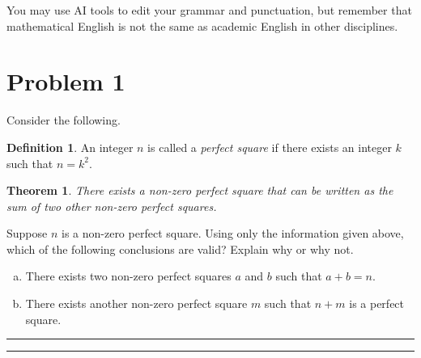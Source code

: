 \documentclass{article}
\newtheorem*{theorem}{Theorem} %
\theoremstyle{definition}
\newtheorem*{definition}{Definition} %
\newenvironment{solution}{\bigskip\hrule{\hfill}}{\bigskip\hrule{\hfill}} %
\begin{document}
You may use AI tools to edit your grammar and punctuation, but remember that mathematical English is not the same as academic English in other disciplines. 

\vfill

\newpage


\section*{Problem 1}

Consider the following.

\begin{definition}
    An integer $n$ is called a \emph{perfect square} if there exists an integer $k$ such that $n=k^2$.
\end{definition}
\begin{theorem}
    There exists a non-zero perfect square that can be written as the sum of two other non-zero perfect squares.
\end{theorem}

Suppose $n$ is a non-zero perfect square. Using only the information given above, which of the following conclusions are valid? Explain why or why not.

\begin{enumerate}[a)] %
    \item There exists two non-zero perfect squares $a$ and $b$ such that $a+b=n$.

    \item There exists another non-zero perfect square $m$ such that $n+m$ is a perfect square.
\end{enumerate}

\begin{solution}


\end{solution}


\newpage

\end{document}
